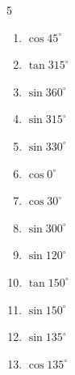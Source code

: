 \begin{multicols}{5}
\begin{enumerate}
  \item $\displaystyle \cos{45^\circ}$


\columnbreak %

  \item $\displaystyle \tan{315^\circ}$

        \phantom{$\displaystyle =-1$}

  \item $\displaystyle \sin{360^\circ}$

        \phantom{$\displaystyle =0$}

  \item $\displaystyle \sin{315^\circ}$


  \item $\displaystyle \sin{330^\circ}$


  \item $\displaystyle \cos{0^\circ}$

        \phantom{$\displaystyle =1$}

  \item $\displaystyle \cos{30^\circ}$


  \item $\displaystyle \sin{300^\circ}$


  \item $\displaystyle \sin{120^\circ}$


  \item $\displaystyle \tan{150^\circ}$


  \item $\displaystyle \sin{150^\circ}$


  \item $\displaystyle \sin{135^\circ}$


  \item $\displaystyle \cos{135^\circ}$


\end{enumerate}
\end{multicols}

